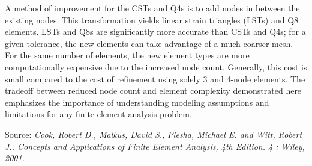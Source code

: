 \documentclass[../main.tex]{subfiles}
\begin{document}

A method of improvement for the CSTs and Q4s is to add nodes in between the existing nodes.
This transformation yields linear strain triangles (LSTs) and Q8 elements.
LSTs and Q8s are significantly more accurate than CSTs and Q4s; for a given tolerance, the new elements can take advantage of a much coarser mesh.
For the same number of elements, the new element types are more computationally expensive due to the increased node count.
Generally, this cost is small compared to the cost of refinement using solely 3 and 4-node elements.
The tradeoff between reduced node count and element complexity demonstrated here emphasizes the importance of understanding modeling assumptions and limitations for any finite element analysis problem.

Source: \textit{Cook, Robert D., Malkus, David S., Plesha, Michael E. and Witt, Robert J.. Concepts and Applications of Finite Element Analysis, 4th Edition. 4 : Wiley, 2001.}
\end{document}
